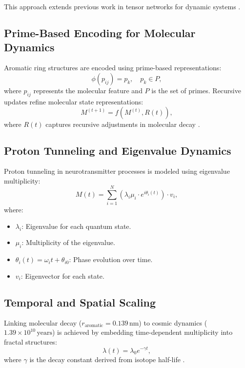 \documentclass{article}
\theoremstyle{plain}
\begin{document}
This approach extends previous work in tensor networks for dynamic systems \cite{TensorNetworks2022}.

\subsection{Prime-Based Encoding for Molecular Dynamics}
Aromatic ring structures are encoded using prime-based representations:
\begin{equation}
\phi(p_{ij}) = p_k, \quad p_k \in P,
\end{equation}
where \( p_{ij} \) represents the molecular feature and \( P \) is the set of primes. Recursive updates refine molecular state representations:
\begin{equation}
M^{(t+1)} = f(M^{(t)}, R(t)),
\end{equation}
where \( R(t) \) captures recursive adjustments in molecular decay \cite{QuantumOptimization2023}.

\subsection{Proton Tunneling and Eigenvalue Dynamics}
Proton tunneling in neurotransmitter processes is modeled using eigenvalue multiplicity:
\begin{equation}
M(t) = \sum_{i=1}^{N} (\lambda_i \mu_i \cdot e^{i \theta_i(t)}) \cdot v_i,
\end{equation}
where:
\begin{itemize}
    \item \( \lambda_i \): Eigenvalue for each quantum state.
    \item \( \mu_i \): Multiplicity of the eigenvalue.
    \item \( \theta_i(t) = \omega_i t + \theta_{i0} \): Phase evolution over time.
    \item \( v_i \): Eigenvector for each state.
\end{itemize}

\subsection{Temporal and Spatial Scaling}
Linking molecular decay (\( r_{\text{aromatic}} = 0.139 \, \text{nm} \)) to cosmic dynamics (\( 1.39 \times 10^{10} \, \text{years} \)) is achieved by embedding time-dependent multiplicity into fractal structures:
\begin{equation}
\lambda(t) = \lambda_0 e^{-\gamma t},
\end{equation}
where \( \gamma \) is the decay constant derived from isotope half-life \cite{IsotopeDynamics2021}.
\end{document}
